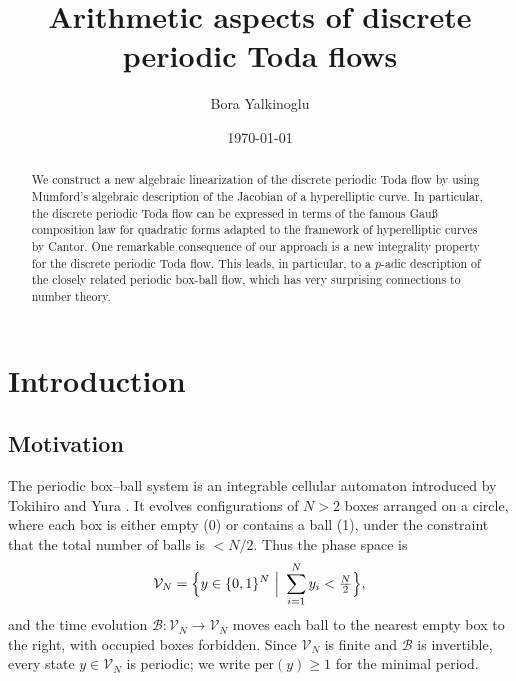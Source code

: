 \documentclass[11pt, a4paper]{amsart}
\theoremstyle{plain}
\numberwithin{equation}{section}
\begin{document}
\author{Bora Yalkinoglu} 
\address{CNRS and IRMA, 7 rue René-Descartes, 67100 Strasbourg}
\date{\today}
\title{Arithmetic aspects of discrete periodic Toda flows}
\maketitle


\begin{abstract}
\noindent
We construct a new algebraic linearization of the discrete periodic Toda flow by using Mumford's algebraic description of the Jacobian of a hyperelliptic curve. In particular, the discrete periodic Toda flow can be expressed in terms of the famous Gauß composition law for quadratic forms adapted to the framework of hyperelliptic curves by Cantor. One remarkable consequence of our approach is a new integrality property for the discrete periodic Toda flow. This leads, in particular, to a $p$-adic description of the closely related periodic box-ball flow, which has very surprising connections to number theory.
\end{abstract}

\section{Introduction}

\subsection{Motivation}
\label{sec-motivation}
The periodic box--ball system is an integrable cellular automaton introduced by Tokihiro and Yura \cite{yura}.
It evolves configurations of $N>2$ boxes arranged on a circle, where each box is either empty (0) or contains a ball (1),
under the constraint that the total number of balls is $<N/2$. Thus the phase space is
\[
\mathcal V_N=\Bigl\{y\in\{0,1\}^N \ \Big|\ \sum_{i=1}^N y_i < \tfrac{N}{2}\Bigr\},
\]
and the time evolution $\mathcal B:\mathcal V_N\to \mathcal V_N$ moves each ball to the nearest empty box to the right, with occupied boxes forbidden.
Since $\mathcal V_N$ is finite and $\mathcal B$ is invertible, every state $y\in \mathcal V_N$ is periodic; we write $\mathrm{per}(y)\ge 1$ for the minimal period.
\end{document}
